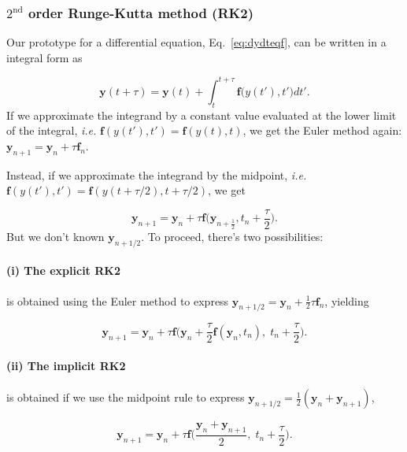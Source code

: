 \subsubsection*{$2^\text{nd}$ order Runge-Kutta method (RK2)}

Our prototype for a differential equation, Eq.~\eqref{eq:dydteqf}, can be written in a integral form as

\begin{equation}
 \bm{y}(t+\tau) = \bm{y}(t) + \int_{t}^{t+\tau} \bm{f}\Big(y(t'), t'\Big) dt'.
\end{equation}
If we approximate the integrand by a constant value evaluated at the lower limit of the integral, \textit{i.e.} $\bm{f}(y(t'), t') = \bm{f}(y(t), t)$, we get the Euler method again: $\bm{y}_{n+1} = \bm{y}_n + \tau \bm{f}_n$.

Instead, if we approximate the integrand by the midpoint, \textit{i.e.} $\bm{f}(y(t'), t') = \bm{f}(y(t+\tau/2), t+\tau/2)$, we get

\begin{equation}
 \bm{y}_{n+1} = \bm{y}_n + \tau \bm{f}\Big( \bm{y}_{n+\frac{1}{2}}, t_n+\frac{\tau}{2} \Big).
\end{equation}
But we don't known $\bm{y}_{n+1/2}$. To proceed, there's two possibilities:

\paragraph*{(i) The explicit RK2} is obtained using the Euler method to express $\bm{y}_{n+1/2} = \bm{y}_n + \frac{1}{2}\tau\bm{f}_n$, yielding

\begin{equation}
 \bm{y}_{n+1} = \bm{y}_n + \tau \bm{f}\Big( \bm{y}_n + \frac{\tau}{2}\bm{f}(\bm{y}_n, t_n),\; t_n+\frac{\tau}{2} \Big).
 \label{eq:explicitRK2}
\end{equation}

\paragraph*{(ii) The implicit RK2} is obtained if we use the midpoint rule to express $\bm{y}_{n+1/2} = \frac{1}{2}( \bm{y}_n + \bm{y}_{n+1} )$,

\begin{equation}
 \bm{y}_{n+1} = \bm{y}_n + \tau \bm{f}\Big( \frac{\bm{y}_n + \bm{y}_{n+1}}{2} ,\; t_n+\frac{\tau}{2} \Big).
 \label{eq:implicitRK2}
\end{equation}

